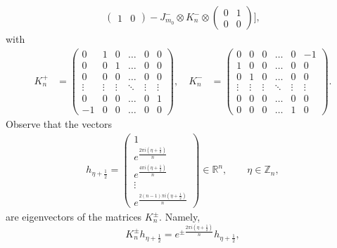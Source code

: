 \documentclass[12pt,reqno]{amsart}
\numberwithin{equation}{section}
\newcommand{\R}{{\mathbb R}}
\newcommand{\Z}{{\mathbb Z}}
\begin{document}
\begin{appendix}
\begin{equation}
\begin{aligned}
\begin{pmatrix}
1 & 0
\end{pmatrix}
-J_{m_0}^-\otimes K_n^-\otimes \begin{pmatrix}
0 & 1 \\
0 & 0
\end{pmatrix}
\bigg],
\end{aligned}
\end{equation}
with
\begin{equation}\label{k2m3}
\begin{aligned}
K_{n}^+&
=\begin{pmatrix}
0 & 1 & 0 & \ldots & 0 & 0\\
0 & 0 & 1 & \ldots & 0 & 0\\
0 & 0 & 0 & \ldots & 0 & 0\\
\vdots & \vdots & \vdots & \ddots & \vdots  & \vdots \\
0 & 0 & 0 & \ldots & 0 & 1 \\
-1 & 0 & 0 & \ldots & 0 & 0
\end{pmatrix},
\quad K_{n}^-&
=\begin{pmatrix}
0 & 0 & 0 & \ldots & 0 & -1\\
1 & 0 & 0 & \ldots & 0 & 0\\
0 & 1 & 0 & \ldots & 0 & 0\\
\vdots & \vdots & \vdots & \ddots & \vdots  & \vdots \\
0 & 0 & 0 & \ldots & 0 & 0 \\
0 & 0 & 0 & \ldots & 1 & 0
\end{pmatrix}.
\end{aligned}
\end{equation}
Observe that the vectors 
\begin{equation}\label{k2m4}
\begin{aligned}
h_{\eta+\frac{1}{2}}=
\begin{pmatrix}
1  \\
e^{\frac{2\pi i \left(\eta+\frac{1}{2}\right)}{n}} \\
e^{\frac{4\pi i  \left(\eta+\frac{1}{2}\right)}{n}} \\
\vdots \\
e^{\frac{2(n-1)\pi i  \left(\eta+\frac{1}{2}\right)}{n}}
\end{pmatrix}\in\R^{n},\qquad \eta\in\Z_n,
\end{aligned}
\end{equation}
are eigenvectors of the matrices $K_n^{\pm}$.  Namely, 
\begin{equation}\label{k2m5}
K_{n}^{\pm}h_{\eta+\frac{1}{2}}=e^{\pm\frac{2\pi i\left(\eta+\frac{1}{2}\right)}{n}}h_{\eta+\frac{1}{2}},

\end{equation}
\end{appendix}
\end{document}
